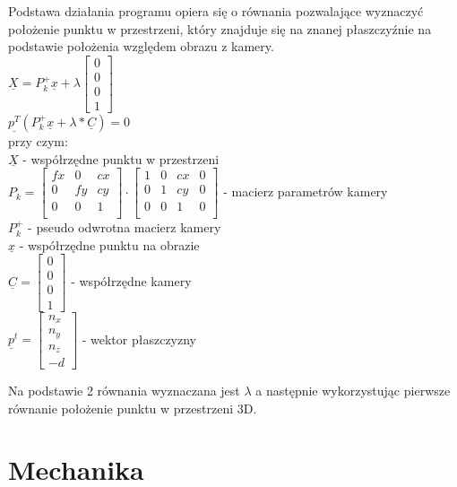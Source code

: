 \documentclass[conference]{IEEEtran}
\begin{document}
Podstawa działania programu opiera się o równania pozwalające wyznaczyć położenie punktu w przestrzeni, który znajduje się na znanej płaszczyźnie na podstawie położenia względem obrazu z kamery.\\
$\underline{X}={P_k^+}\underline{x}+\lambda 
\begin{bmatrix}
    0\\
    0\\
	0\\
    1
\end{bmatrix}$\\
$\underline{p^T}({P_k^+}\underline{x}+\lambda*\underline{C})=0$
\\
przy czym:
\\
$\underline{X}$ - współrzędne punktu w przestrzeni\\
$P_k=
\begin{bmatrix}
    fx&0&cx\\
    0&fy&cy\\
	0&0&1\\
\end{bmatrix}\cdot
\begin{bmatrix}
    1&0&cx&0\\
    0&1&cy&0\\
	0&0&1&0\\
\end{bmatrix}$ - macierz parametrów kamery\\
${P_k^+}$ - pseudo odwrotna macierz kamery\\
$\underline{x}$ - współrzędne punktu na obrazie\\
$\underline{C}=
\begin{bmatrix}
    0\\
    0\\
	0\\
    1
\end{bmatrix}$ - współrzędne kamery\\
$\underline{p}^t = 
\begin{bmatrix}
    n_x\\
    n_y\\
	n_z\\
    -d
\end{bmatrix}$ - wektor płaszczyzny

Na podstawie 2 równania wyznaczana jest $\lambda$ a następnie wykorzystując pierwsze równanie położenie punktu w przestrzeni 3D.

\section{Mechanika}
\end{document}
